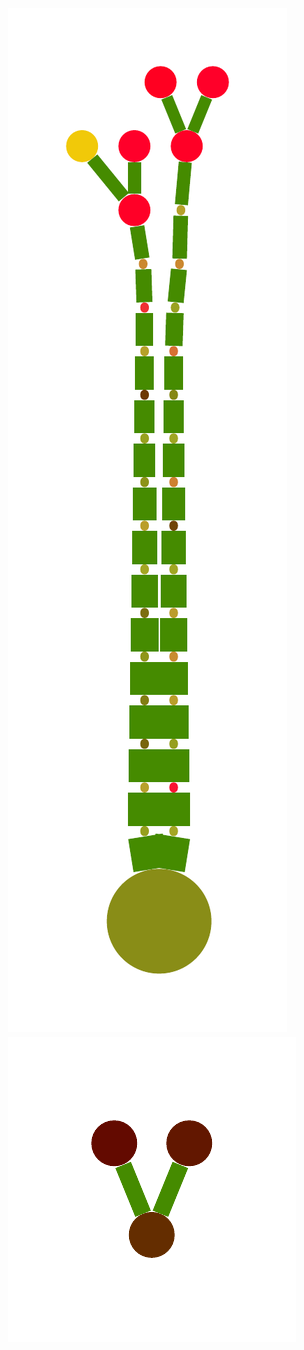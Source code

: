 \documentclass[a4paper,10pt]{article}
\begin{document}
\begin{figure}
{    \includegraphics[scale=.16]{../figures/vector/6-5-tree-data-2.pdf}
    \includegraphics[scale=.16]{../figures/vector/6-5-tree-data-3.pdf}
}
\end{figure}
\end{document}
